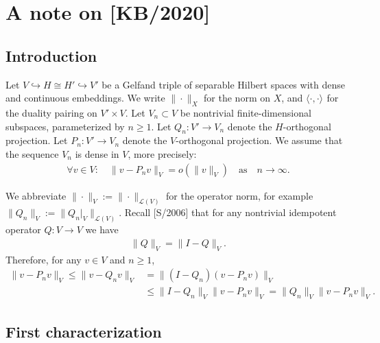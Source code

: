 \documentclass[12pt]{article}
\newcommand{\norm}[2]{\|#1\|_{#2}}
\newcommand{\scalar}[2]{\langle#1\rangle_{#2}}
\newcommand{\from}{\colon}
\renewcommand{\title}{A note on [KB/2020]}
\begin{document}
	
	\section*{\title}
	
	
	\subsection*{Introduction}
	
	
	
	Let $V \hookrightarrow H \cong H' \hookrightarrow V'$
	be a Gelfand triple of separable Hilbert spaces with dense and continuous embeddings.
	We write $\norm{\cdot}{X}$ for the norm on $X$,
	and
	$\scalar{\cdot, \cdot}{}$ for the duality pairing on $V' \times V$.
	Let $V_n \subset V$ be nontrivial finite-dimensional subspaces, 
	parameterized by $n \geq 1$.
	Let $Q_n \from V' \to V_n$ denote the $H$-orthogonal projection.
	Let $P_n \from V' \to V_n$ denote the $V$-orthogonal projection.
	We assume that the sequence $V_n$ is dense in $V$, more precisely:
	\begin{align}
		\label{e:P}
		\forall v \in V:
		\quad
		\norm{v - P_n v}{V} = o(\norm{v}{V})
		\quad\text{as}\quad
		n \to \infty
		.
	\end{align}
	
	We abbreviate $\norm{\cdot}{V} := \norm{\cdot}{\mathcal{L}(V)}$ 
	for the operator norm,
	for example
	$\norm{Q_n}{V} := \norm{Q_n|_V}{\mathcal{L}(V)}$.
	Recall [S/2006]
	that for any nontrivial idempotent operator $Q \from V \to V$ we have
	\begin{align}
		\label{e:IQ}
		\norm{Q}{V} = \norm{I - Q}{V}
		.
	\end{align}
	Therefore, for any $v \in V$ and $n \geq 1$,
	\begin{align}
		\label{e:approx}
		\norm{v - P_n v}{V}
		\leq
		\norm{v - Q_n v}{V}
		& =
		\norm{(I - Q_n)(v - P_n v)}{V}
		\\
		& \leq
		\norm{I - Q_n}{V} \norm{v - P_n v}{V}
		=
		\norm{Q_n}{V} \norm{v - P_n v}{V}
		.
	\end{align}
	
	
	
	
	\subsection*{First characterization}
	
\end{document}
